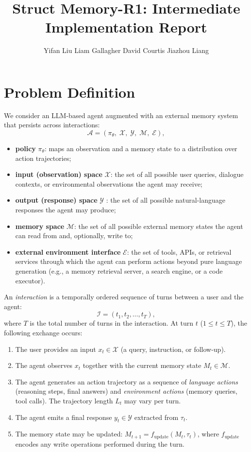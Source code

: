 \documentclass{article}
\title{Struct Memory-R1: Intermediate Implementation Report}
\author{
  Yifan Liu \And Liam Gallagher \And David Courtis \And Jiazhou Liang
}
\theoremstyle{definition}
\begin{document}
\maketitle


\section{Problem Definition}

We consider an LLM-based agent augmented with an external memory system that persists across interactions:
\[
\mathcal{A} = (\pi_\theta,\; \mathcal{X},\; \mathcal{Y},\; \mathcal{M},\; \mathcal{E}),
\]
\begin{itemize}[nosep]
    \item \textbf{policy} $\pi_\theta$: maps an observation and a memory state to a distribution over action trajectories;
    \item \textbf{input (observation) space}  $\mathcal{X}$: the set of all possible user queries, dialogue contexts, or environmental observations the agent may receive;
    \item \textbf{output (response) space} $\mathcal{Y}$ : the set of all possible natural-language responses the agent may produce;
    \item  \textbf{memory space} $\mathcal{M}$: the set of all possible external memory states the agent can read from and, optionally, write to;
    \item \textbf{external environment interface} $\mathcal{E}$: the set of tools, APIs, or retrieval services through which the agent can perform actions beyond pure language generation (e.g., a memory retrieval server, a search engine, or a code executor).
\end{itemize}


An \emph{interaction} is a temporally ordered sequence of turns between a user and the agent:
\[
\mathcal{I} = (t_1, t_2, \ldots, t_T),
\]
where $T$ is the total number of turns in the interaction.
At turn $t$ ($1 \le t \le T$), the following exchange occurs:
\begin{enumerate}[nosep]
    \item The user provides an input $x_t \in \mathcal{X}$ (a query, instruction, or follow-up).
    \item The agent observes $x_t$ together with the current memory state $M_t \in \mathcal{M}$.
    \item The agent generates an action trajectory as a sequence of \emph{language actions} (reasoning steps, final answers) and \emph{environment actions} (memory queries, tool calls). The trajectory length $L_t$ may vary per turn.
    \item The agent emits a final response $y_t \in \mathcal{Y}$ extracted from $\tau_t$.
    \item The memory state may be updated: $M_{t+1} = f_{\text{update}}(M_t, \tau_t)$, where $f_{\text{update}}$ encodes any write operations performed during the turn.
\end{enumerate}
\end{document}
